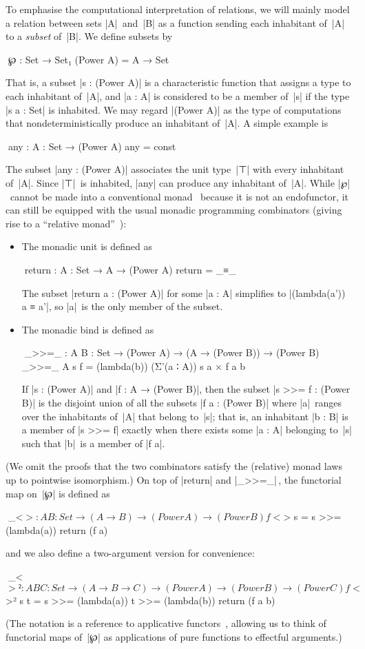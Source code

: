 To emphasise the computational interpretation of relations, we will mainly model a relation between sets |A|~and~|B| as a function sending each inhabitant of~|A| to a \emph{subset} of~|B|.
We define subsets by
\begin{code}
^^^℘ : Set → Set₁
(Power A) = A → Set
\end{code}
That is, a subset |s : (Power A)| is a characteristic function that assigns a type to each inhabitant of~|A|, and |a : A| is considered to be a member of~|s| if the type |s a : Set| is inhabited.
We may regard |(Power A)| as the type of computations that nondeterministically produce an inhabitant of~|A|.
A simple example is
\begin{code}
^^^any : {A : Set} → (Power A)
any = const ⊤
\end{code}
The subset |any : (Power A)| associates the unit type~|⊤| with every inhabitant of~|A|.
Since |⊤|~is inhabited, |any| can produce any inhabitant of~|A|.
While |℘|~cannot be made into a conventional monad~\citep{Moggi-monads, Wadler-essence} because it is not an endofunctor, it can still be equipped with the usual monadic programming combinators (giving rise to a ``relative monad''~\citep{Altenkirch-relative-monads}):
\begin{itemize}
\item The monadic unit is defined as
\begin{code}
^^^return : {A : Set} → A → (Power A)
return = _≡_
\end{code}
The subset |return a : (Power A)| for some |a : A| simplifies to |(lambda(a')) a ≡ a'|, so |a|~is the only member of the subset.
\item The monadic bind is defined as
\begin{code}
^^^_>>=_ : {A B : Set} → (Power A) → (A → (Power B)) → (Power B)
_>>=_ {A} s f = (lambda(b)) (Σ'(a ∶ A)) s a × f a b
\end{code}
If |s : (Power A)| and |f : A → (Power B)|, then the subset |s >>= f : (Power B)| is the disjoint union of all the subsets |f a : (Power B)| where |a|~ranges over the inhabitants of~|A| that belong to~|s|; that is, an inhabitant |b : B| is a member of |s >>= f| exactly when there exists some |a : A| belonging to~|s| such that |b|~is a member of |f a|.
\end{itemize}
(We omit the proofs that the two combinators satisfy the (relative) monad laws up to pointwise isomorphism.)
On top of |return| and |_>>=_|\,, the functorial map on~|℘| is defined as
\begin{code}
^^^_<$> : {A B : Set} → (A → B) → (Power A) → (Power B)
f <$> s = s >>= (lambda(a)) return (f a)
\end{code}
and we also define a two-argument version for convenience:
\begin{code}
^^^_<$>² : {A B C : Set} → (A → B → C) → (Power A) → (Power B) → (Power C)
f <$>² s t = s >>= (lambda(a)) t >>= (lambda(b)) return (f a b)
\end{code}
(The notation is a reference to applicative functors~\citep{McBride-Applicative}, allowing us to think of functorial maps of~|℘| as applications of pure functions to effectful arguments.)

